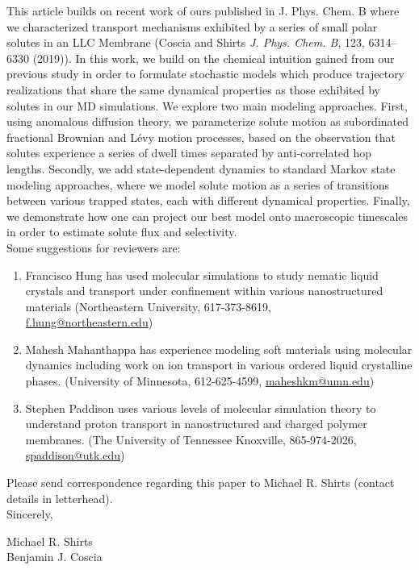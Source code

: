 \documentclass[fontsize=11pt]{article}
\begin{document}
	This article builds on recent work of ours published in
        J. Phys. Chem. B where we characterized transport mechanisms
        exhibited by a series of small polar solutes in an LLC
        Membrane (Coscia and Shirts \textit{J. Phys.  Chem. B}, 123,
        6314--6330 (2019)). In this work, we build on the chemical
        intuition gained from our previous study in order to formulate
        stochastic models which produce trajectory realizations that
        share the same dynamical properties as those exhibited by
        solutes in our MD simulations. We explore two main modeling
        approaches. First, using anomalous diffusion theory, we
        parameterize solute motion as subordinated fractional Brownian
        and L\'evy motion processes, based on the observation that
        solutes experience a series of dwell times separated by
        anti-correlated hop lengths. Secondly, we add state-dependent
        dynamics to standard Markov state modeling approaches, where
        we model solute motion as a series of transitions between
        various trapped states, each with different dynamical
        properties.  Finally, we demonstrate how one can project our
        best model onto macroscopic timescales in order to estimate
        solute flux and selectivity.\\
	
	\noindent Some suggestions for reviewers are:
	\begin{enumerate}
	
		\item Francisco Hung has used molecular simulations to study nematic liquid crystals
		and transport under confinement within various nanostructured materials 
		(Northeastern University, 617-373-8619,\\ \href{mailto:f.hung@northeastern.edu}{f.hung@northeastern.edu})
		
		\item Mahesh Mahanthappa has experience modeling soft materials using molecular dynamics
		including work on ion transport in various ordered liquid crystalline phases. 
		(University of Minnesota, 612-625-4599, \href{mailto:maheshkm@umn.edu}{maheshkm@umn.edu})
		
		\item Stephen Paddison uses various levels of molecular simulation theory to understand
		proton transport in nanostructured and charged polymer membranes. (The University of Tennessee 
		Knoxville, 865-974-2026, \href{mailto:spaddison@utk.edu}{spaddison@utk.edu})
		
	\end{enumerate}
	
	\noindent Please send correspondence regarding this paper to Michael R. Shirts (contact
	details in letterhead).\\	
	
	\noindent Sincerely,
	
	\noindent Michael R. Shirts \\
	\noindent Benjamin J. Coscia \\
	
\end{document}
